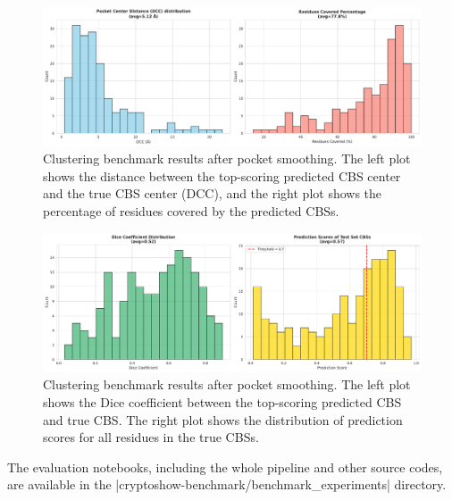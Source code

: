 \begin{figure}[htbp]
    \centering
    \includegraphics[width=\textwidth]{img/smoothened-1.pdf}
    \caption{Clustering benchmark results after pocket smoothing. The left plot shows the distance between the top-scoring predicted CBS center and the true CBS center (DCC), and the right plot shows the percentage of residues covered by the predicted CBSs.}
    \label{fig:clustering-benchmark-smoothened}
\end{figure}

\begin{figure}[htbp]
    \centering
    \includegraphics[width=\textwidth]{img/smoothened-2.pdf}
    \caption{Clustering benchmark results after pocket smoothing. The left plot shows the Dice coefficient between the top-scoring predicted CBS and true CBS. The right plot shows the distribution of prediction scores for all residues in the true CBSs.}
    \label{fig:clustering-benchmark-smoothened-dice}
\end{figure}

The evaluation notebooks, including the whole pipeline and other source codes, are available in the \inline|cryptoshow-benchmark/benchmark_experiments| directory.
